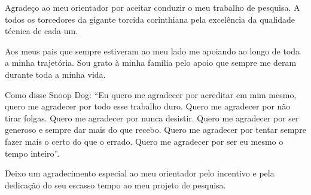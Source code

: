 \begin{agradecimentos}
Agradeço ao meu orientador por aceitar conduzir o meu trabalho de pesquisa.
A todos os torcedores da gigante torcida corinthiana pela excelência da qualidade técnica de cada um.

Aos meus pais que sempre estiveram ao meu lado me apoiando ao longo de toda a minha trajetória. Sou grato à minha família pelo apoio que sempre me deram durante toda a minha vida.

Como disse Snoop Dog: ``Eu quero me agradecer por acreditar em mim mesmo, quero me agradecer por todo esse trabalho duro. Quero me agradecer por não tirar folgas. Quero me agradecer por nunca desistir. Quero me agradecer por ser generoso e sempre dar mais do que recebo. Quero me agradecer por tentar sempre fazer mais o certo do que o errado. Quero me agradecer por ser eu mesmo o tempo inteiro''.

Deixo um agradecimento especial ao meu orientador pelo incentivo e pela dedicação do seu escasso tempo ao meu projeto de pesquisa.


\end{agradecimentos}
